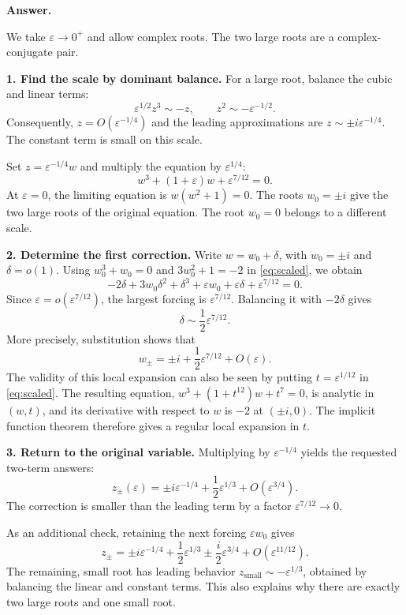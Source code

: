 \documentclass[11pt,a4paper]{article}
\newenvironment{answer}{\par\medskip\textbf{Answer.}\par}{\par\medskip}
\newcommand{\eps}{\varepsilon}
\begin{document}
\begin{answer}
We take $\eps\to0^+$ and allow complex roots.
The two large roots are a complex-conjugate pair.

\textbf{1. Find the scale by dominant balance.}
For a large root, balance the cubic and linear terms:
\[
  \eps^{1/2}z^3\sim-z,
  \qquad z^2\sim-\eps^{-1/2}.
\]
Consequently, $z=O(\eps^{-1/4})$ and the leading approximations are
$z\sim\pm i\eps^{-1/4}$.
The constant term is small on this scale.

Set $z=\eps^{-1/4}w$ and multiply the equation by $\eps^{1/4}$:
\begin{equation}\label{eq:scaled}
  w^3+(1+\eps)w+\eps^{7/12}=0.
\end{equation}
At $\eps=0$, the limiting equation is $w(w^2+1)=0$.
The roots $w_0=\pm i$ give the two large roots of the original
equation. The root $w_0=0$ belongs to a different scale.

\textbf{2. Determine the first correction.}
Write $w=w_0+\delta$, with $w_0=\pm i$ and $\delta=o(1)$.
Using $w_0^3+w_0=0$ and $3w_0^2+1=-2$ in
\eqref{eq:scaled}, we obtain
\[
  -2\delta+3w_0\delta^2+\delta^3
  +\eps w_0+\eps\delta+\eps^{7/12}=0.
\]
Since $\eps=o(\eps^{7/12})$, the largest forcing is
$\eps^{7/12}$. Balancing it with $-2\delta$ gives
\[
  \delta\sim\frac12\eps^{7/12}.
\]
More precisely, substitution shows that
\[
  w_\pm=\pm i+\frac12\eps^{7/12}+O(\eps).
\]
The validity of this local expansion can also be seen by putting
$t=\eps^{1/12}$ in \eqref{eq:scaled}. The resulting equation,
$w^3+(1+t^{12})w+t^7=0$, is analytic in $(w,t)$, and its derivative
with respect to $w$ is $-2$ at $(\pm i,0)$. The implicit function
theorem therefore gives a regular local expansion in $t$.

\textbf{3. Return to the original variable.}
Multiplying by $\eps^{-1/4}$ yields the requested two-term answers:
\begin{equation}
  \boxed{z_\pm(\eps)=\pm i\eps^{-1/4}
       +\frac12\eps^{1/3}+O(\eps^{3/4}).}
\end{equation}
The correction is smaller than the leading term by a factor
$\eps^{7/12}\to0$.

As an additional check, retaining the next forcing $\eps w_0$
gives
\[
  z_\pm=\pm i\eps^{-1/4}+\frac12\eps^{1/3}
       \pm\frac{i}{2}\eps^{3/4}+O(\eps^{11/12}).
\]
The remaining, small root has leading behavior
$z_{\mathrm{small}}\sim-\eps^{1/3}$, obtained by balancing the
linear and constant terms. This also explains why there are
exactly two large roots and one small root.
\end{answer}
\end{document}

